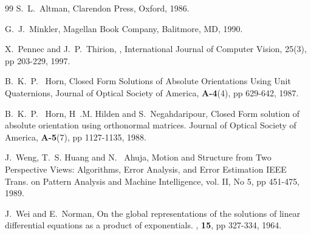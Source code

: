 \documentclass[conference]{IEEEtran}
\begin{document}
\begin{thebibliography}{99}
S.~L.~Altman,
Clarendon Press, Oxford, 1986.

G.~J.~Minkler,
Magellan Book Company, Balitmore, MD, 1990.

X.~Pennec and J.~P.~Thirion,
,
\newblock International Journal of Computer Vision, 25(3), pp 203-229, 1997.
 
B.~K.~P.~ Horn,
\newblock Closed Form Solutions of Absolute Orientations Using Unit Quaternions,
\newblock Journal of Optical Society of America, {\bf A-4}(4), pp 629-642, 1987.

B.~K.~P.~ Horn, H~.M. Hilden and S.~Negahdaripour,
\newblock Closed Form solution of absolute orientation using orthonormal matrices.
\newblock Journal of Optical Society of America, {\bf A-5}(7), pp 1127-1135, 1988.


J.~Weng, T.~S. Huang and N.~ Ahuja,
\newblock Motion and Structure from Two Perspective Views:
Algorithms, Error Analysis, and Error Estimation
\newblock IEEE Trans. on Pattern Analysis and Machine Intelligence, vol. II, No 5, pp 451-475, 1989.

J.~Wei and E.~Norman,
\newblock On the global representations of the solutions of linear differential equations
as a product of exponentials.
, {\bf 15}, pp 327-334, 1964.

\end{thebibliography}
\end{document}
